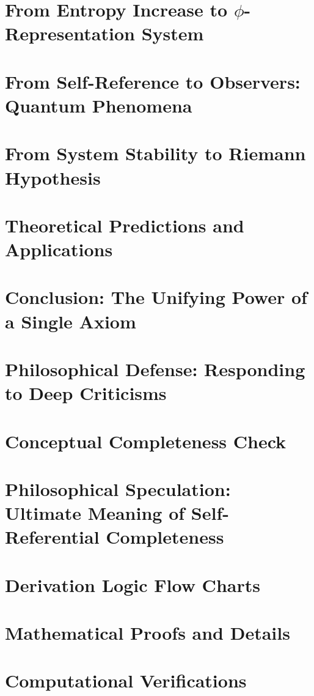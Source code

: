 \documentclass[12pt,a4paper]{book}
\theoremstyle{definition}
\theoremstyle{colored}
\begin{document}
\chapter{From Entropy Increase to $\phi$-Representation System}
\label{ch:encoding}


\chapter{From Self-Reference to Observers: Quantum Phenomena}
\label{ch:quantum}


\chapter{From System Stability to Riemann Hypothesis}
\label{ch:riemann}


\chapter{Theoretical Predictions and Applications}
\label{ch:applications}


\chapter{Conclusion: The Unifying Power of a Single Axiom}
\label{ch:conclusion}


\chapter{Philosophical Defense: Responding to Deep Criticisms}
\label{ch:defense}


\chapter{Conceptual Completeness Check}
\label{ch:completeness}


\chapter{Philosophical Speculation: Ultimate Meaning of Self-Referential Completeness}
\label{ch:philosophy}


\appendix

\chapter{Derivation Logic Flow Charts}
\label{app:flowcharts}


\chapter{Mathematical Proofs and Details}
\label{app:proofs}


\chapter{Computational Verifications}
\label{app:computational}





\printindex
\end{document}
